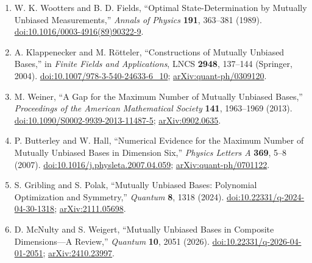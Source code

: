 \begin{enumerate}[label={},leftmargin=4.8em,labelsep=0.5em]
  \footnotesize
  \item[\textup{[WF89]}]\label{ref:p44-wootters-fields}
  W. K. Wootters and B. D. Fields,
  ``Optimal State-Determination by Mutually Unbiased Measurements,''
  \emph{Annals of Physics} \textbf{191}, 363--381 (1989).
  \href{https://doi.org/10.1016/0003-4916(89)90322-9}%
       {doi:10.1016/0003-4916(89)90322-9}.

  \item[\textup{[KR04]}]\label{ref:p44-klappenecker-roetteler}
  A. Klappenecker and M. R\"otteler,
  ``Constructions of Mutually Unbiased Bases,'' in
  \emph{Finite Fields and Applications}, LNCS \textbf{2948}, 137--144
  (Springer, 2004).
  \href{https://doi.org/10.1007/978-3-540-24633-6_10}%
       {doi:10.1007/978-3-540-24633-6\_10};
  \href{https://arxiv.org/abs/quant-ph/0309120}{arXiv:quant-ph/0309120}.

  \item[\textup{[Wei13]}]\label{ref:p44-weiner}
  M. Weiner, ``A Gap for the Maximum Number of Mutually Unbiased Bases,''
  \emph{Proceedings of the American Mathematical Society} \textbf{141},
  1963--1969 (2013).
  \href{https://doi.org/10.1090/S0002-9939-2013-11487-5}%
       {doi:10.1090/S0002-9939-2013-11487-5};
  \href{https://arxiv.org/abs/0902.0635}{arXiv:0902.0635}.

  \item[\textup{[BH07]}]\label{ref:p44-butterley-hall}
  P. Butterley and W. Hall,
  ``Numerical Evidence for the Maximum Number of Mutually Unbiased Bases in
  Dimension Six,'' \emph{Physics Letters A} \textbf{369}, 5--8 (2007).
  \href{https://doi.org/10.1016/j.physleta.2007.04.059}%
       {doi:10.1016/j.physleta.2007.04.059};
  \href{https://arxiv.org/abs/quant-ph/0701122}{arXiv:quant-ph/0701122}.

  \item[\textup{[GP24]}]\label{ref:p44-gribling-polak}
  S. Gribling and S. Polak,
  ``Mutually Unbiased Bases: Polynomial Optimization and Symmetry,''
  \emph{Quantum} \textbf{8}, 1318 (2024).
  \href{https://doi.org/10.22331/q-2024-04-30-1318}%
       {doi:10.22331/q-2024-04-30-1318};
  \href{https://arxiv.org/abs/2111.05698}{arXiv:2111.05698}.

  \item[\textup{[MW26]}]\label{ref:p44-mcnulty-weigert}
  D. McNulty and S. Weigert,
  ``Mutually Unbiased Bases in Composite Dimensions---A Review,''
  \emph{Quantum} \textbf{10}, 2051 (2026).
  \href{https://doi.org/10.22331/q-2026-04-01-2051}%
       {doi:10.22331/q-2026-04-01-2051};
  \href{https://arxiv.org/abs/2410.23997}{arXiv:2410.23997}.


\end{enumerate}
